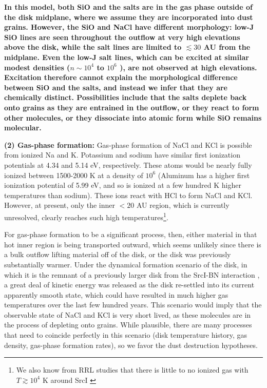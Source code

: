 \documentclass[twocolumn]{aastex62}
\newcommand{\sourcei}{SrcI\xspace}
\newcommand{\referee}[1]{\textbf{#1}}
\begin{document}
\referee{
In this model, both SiO and the salts are in the gas phase outside of the disk
midplane, where we assume they are incorporated into dust grains.  However, the
SiO and NaCl have different morphology: low-J SiO lines are seen throughout the
outflow at very high elevations above the disk, while the salt lines are
limited to $\lesssim 30$ AU from the midplane.  Even the low-J salt lines,
which can be excited at similar modest densities ($n\sim10^4$ to $10^6$
\percc), are not observed at high elevations.  Excitation therefore cannot
explain the morphological difference between SiO and the salts, and instead we
infer that they are chemically distinct.  Possibilities include that the salts
deplete back onto grains as they are entrained in the outflow, or they react to
form other molecules, or they dissociate into atomic form while SiO remains
molecular.
}



\textbf{(2) Gas-phase formation:}
Gas-phase formation of NaCl and KCl is possible from ionized Na and K.
Potassium and sodium have similar first ionization potentials at 4.34 and 5.14
eV, respectively.  These atoms would be nearly fully ionized between 1500-2000
K at a density of $10^6$ \percc (Aluminum has a higher first ionization
potential of 5.99 eV, and so is ionized at a few hundred K higher temperatures
than sodium).  These ions react with HCl to form NaCl and KCl.  However, at
present, only the inner $<20$ AU region, which is currently unresolved, clearly
reaches such high temperatures\footnote{We also know from RRL studies that
there is little to no ionized gas with $T\gtrsim10^4$ K around \sourcei
\citep{Plambeck2016a,Baez-Rubio2018a}}.  

For gas-phase formation to be a significant process, then, either material in
that hot inner region is being transported outward, which seems unlikely since
there is a bulk outflow lifting material off of the disk, or the disk was
previously substantially warmer.  Under the dynamical formation scenario of the
disk, in which it is the remnant of a previously larger disk from the
\sourcei-BN interaction \citep{Bally2017a,Luhman2017a}, a great deal of kinetic
energy was released as the disk re-settled into its current apparently smooth
state, which could have resulted in much higher gas temperatures over the last
few hundred years.  This scenario would imply that the observable state of NaCl
and KCl is very short lived, as these molecules are in the process of depleting
onto grains.  While plausible, there are many processes that need to coincide
perfectly in this scenario (disk temperature history, gas density, gas-phase
formation rates), so we favor the dust destruction hypotheses.
\end{document}
